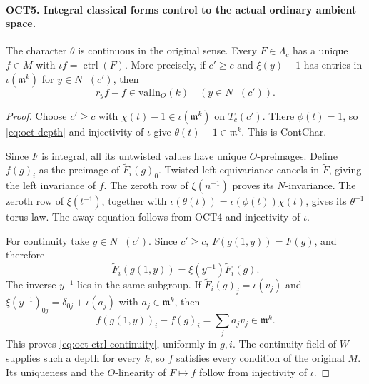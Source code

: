 \paragraph{OCT5. Integral classical forms control to the actual ordinary ambient space.}
\label{claim:OCT5}
The character $\theta$ is continuous in the original sense.
Every $F\in\Lambda_c$ has a unique $f\in M$ with
$\iota f=\operatorname{ctrl}(F)$.  More precisely, if $c'\geq c$
and $\xi(y)-1$ has entries in $\iota(\mathfrak m^k)$ for
$y\in N^-(c')$, then
\begin{equation}\label{eq:oct-ctrl-continuity}
                r_yf-f\in\mathrm{valIn}_O(k)
                         \quad(y\in N^-(c')).
\end{equation}
\begin{proof}
Choose $c'\geq c$ with $\chi(t)-1\in\iota(\mathfrak m^k)$
on $T_c(c')$.  There $\phi(t)=1$, so
\eqref{eq:oct-depth} and injectivity of $\iota$ give
$\theta(t)-1\in\mathfrak m^k$.  This is ContChar.

Since $F$ is integral, all its untwisted values have unique
$O$-preimages.  Define $f(g)_i$ as the preimage of
$\widetilde F_i(g)_0$.  Twisted left equivariance cancels in
$\widetilde F$, giving the left invariance of $f$.  The zeroth
row of $\xi(n^{-1})$ proves its $N$-invariance.  The zeroth
row of $\xi(t^{-1})$, together with
$\iota(\theta(t))=\iota(\phi(t))\chi(t)$, gives its
$\theta^{-1}$ torus law.  The away equation follows from OCT4
and injectivity of $\iota$.

For continuity take $y\in N^-(c')$.  Since $c'\geq c$,
$F(g(1,y))=F(g)$, and therefore
\[
 \widetilde F_i(g(1,y))=\xi(y^{-1})\widetilde F_i(g).
\]
The inverse $y^{-1}$ lies in the same subgroup.  If
$\widetilde F_i(g)_j=\iota(v_j)$ and
$\xi(y^{-1})_{0j}=\delta_{0j}+\iota(a_j)$ with
$a_j\in\mathfrak m^k$, then
\[
                  f(g(1,y))_i-f(g)_i=\sum_j a_jv_j
                                                  \in\mathfrak m^k.
\]
This proves \eqref{eq:oct-ctrl-continuity}, uniformly in $g,i$.
The continuity field of $W$ supplies such a depth for every $k$,
so $f$ satisfies every condition of the original $M$.  Its
uniqueness and the $O$-linearity of $F\mapsto f$ follow from
injectivity of $\iota$.
\end{proof}

